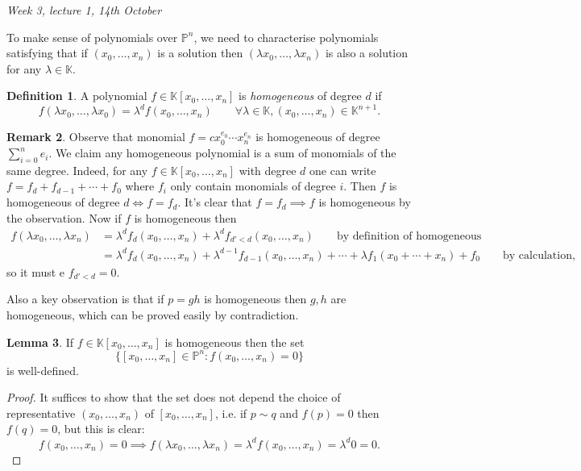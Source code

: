 \documentclass{article}
\newcommand{\K}{\mathbb{K}}
\newcommand{\p}{\mathbb{P}}
\theoremstyle{definition}
\newtheorem{defn}{Definition}[subsection]
\newtheorem{lemma}[defn]{Lemma}
\newtheorem{remark}[defn]{Remark}
\begin{document}
\begin{flushright}
\textit{Week 3, lecture 1, 14th October}
\end{flushright}

To make sense of polynomials over $\p^n$, we need to characterise polynomials satisfying that if $(x_0,\ldots,x_n)$ is a solution then $(\lambda x_0,\ldots,\lambda x_n)$ is also a solution for any $\lambda\in\K$.

\begin{defn}
A polynomial $f\in\K[x_0,\ldots,x_n]$ is \textit{homogeneous} of degree $d$ if
\[
f(\lambda x_0,\ldots,\lambda x_0)=\lambda^d f(x_0,\ldots,x_n) \qquad \forall\lambda\in\K,(x_0,\ldots,x_n)\in\K^{n+1}.
\]
\end{defn}
\begin{remark}
\label{remark:homogeneous}
Observe that monomial $f=cx_0^{e_0}\cdots x_n^{e_n}$ is homogeneous of degree $\sum_{i=0}^n e_i$. We claim any homogeneous polynomial is a sum of monomials of the same degree. Indeed, for any $f\in\K[x_0,\ldots,x_n]$ with degree $d$ one can write $f=f_d+f_{d-1}+\cdots+f_0$ where $f_i$ only contain monomials of degree $i$. Then $f$ is homogeneous of degree $d\iff f=f_d$. It's clear that $f=f_d\implies f$ is homogeneous by the observation. Now if $f$ is homogeneous then
\[
\begin{aligned}
f(\lambda x_0,\ldots,\lambda x_n)&=\lambda^d f_d(x_0,\ldots,x_n)+\lambda^d f_{d'<d}(x_0,\ldots,x_n) \qquad \text{by definition of homogeneous} \\
&=\lambda^d f_d(x_0,\ldots,x_n)+\lambda^{d-1}f_{d-1}(x_0,\ldots,x_n)+\cdots+\lambda f_1(x_0+\cdots+x_n)+f_0\qquad\text{by calculation,}
\end{aligned}
\]
so it must e $f_{d'<d}=0$.

Also a key observation is that if $p=gh$ is homogeneous then $g,h$ are homogeneous, which can be proved easily by contradiction.
\end{remark}

\begin{lemma}
If $f\in\K[x_0,\ldots,x_n]$ is homogeneous then the set
\[
\{[x_0,\ldots,x_n]\in\p^n:f(x_0,\ldots,x_n)=0\}
\]
is well-defined.
\end{lemma}
\begin{proof}
It suffices to show that the set does not depend the choice of representative $(x_0,\ldots,x_n)$ of $[x_0,\ldots,x_n]$, i.e. if $p\sim q$ and $f(p)=0$ then $f(q)=0$, but this is clear:
\[
f(x_0,\ldots,x_n)=0\implies f(\lambda x_0,\ldots,\lambda x_n)=\lambda^d f(x_0,\ldots,x_n)=\lambda^d 0=0.
\]
\end{proof}
\end{document}
